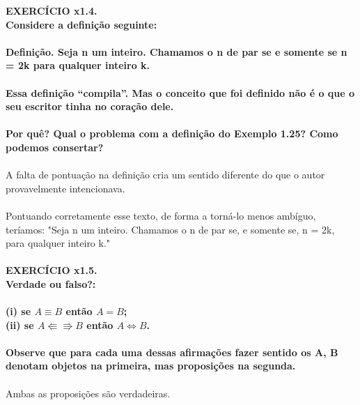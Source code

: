 \documentclass[a4paper, 12pt]{article}
\begin{document}
\noindent \textbf{EXERCÍCIO x1.4. \\ 
Considere a definição seguinte: \\ \\
Definição. Seja n um inteiro. Chamamos o n de par se e somente se n = 2k para qualquer inteiro k. \\ \\
Essa definição “compila”. Mas o conceito que foi definido não é o que o seu escritor tinha
no coração dele. \\ \\
Por quê? Qual o problema com a definição do Exemplo 1.25? Como podemos consertar?} \\ \\
A falta de pontuação na definição cria um sentido diferente do que o autor provavelmente intencionava. \\ \\
Pontuando corretamente esse texto, de forma a torná-lo menos ambíguo, teríamos: "Seja n um inteiro. Chamamos o n de par se, e somente se, n = 2k, para qualquer inteiro k." \\ \\

\noindent \textbf{EXERCÍCIO x1.5. \\
Verdade ou falso?: \\ \\
(i) se $A \equiv B$ então $A = B$; \\
(ii) se $A \Lleftarrow\Rrightarrow B$ então $A \iff B$. \\ \\
Observe que para cada uma dessas afirmações fazer sentido os A, B denotam objetos na primeira, mas proposições na segunda. } \\ \\
Ambas as proposições são verdadeiras. \\ \\
\end{document}
